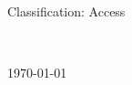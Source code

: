 \begin{titlepage}
	\vspace{0.8cm}
	
	\begin{minipage}{0.4\textwidth}
		\begin{flushleft}
			{\normalsize Classification: Access}
		\end{flushleft}
	\end{minipage}
	~
	\begin{minipage}{0.4\textwidth}
		\begin{flushright}
			{\normalsize\today} %
		\end{flushright}
	\end{minipage}
	
\end{titlepage}